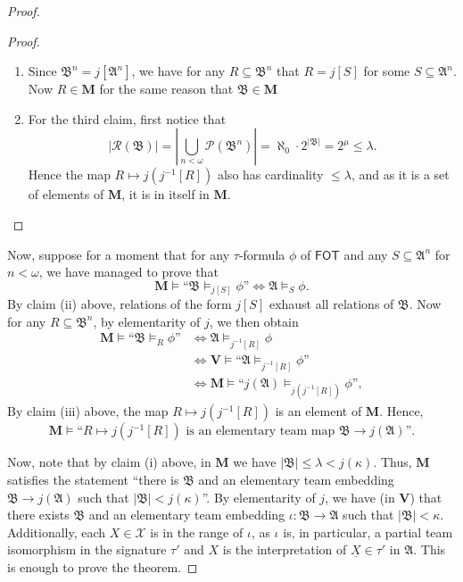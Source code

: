 \documentclass[a4paper]{amsart}
\theoremstyle{definition}
\theoremstyle{remark}
\newcommand{\A}{\mathcal{A}}
\newcommand{\B}{\mathcal{B}}
\DeclareMathOperator{\Pow}{\wp}
\newcommand\fot{\mathsf{FOT}}
\newcommand{\R}{\mathcal{R}}
\newcommand{\X}{\mathcal{X}}
\newcommand{\V}{\mathbf{V}}
\theoremstyle{definition}
\renewcommand{\A}{\mathfrak{A}}
\renewcommand{\B}{\mathfrak{B}}
\newcommand{\bM}{\mathbf{M}}
\renewcommand{\Pow}{\mathcal{P}}
\begin{document}
\begin{proof}
\begin{proof}
\begin{enumerate}
            \item  Since $\B^n = j[\A^n]$, we have for any $R\subseteq\B^n$ that $R = j[S]$ for some $S\subseteq\A^n$. Now $R\in\bM$ for the same reason that $\B\in\bM$

            \item For the third claim, first notice that
            \[
                |\R(\B)| = \left|\bigcup_{n<\omega}\Pow(\B^n)\right| = \aleph_0\cdot 2^{|\B|} = 2^\mu\leq\lambda.
            \]
            Hence the map $R\mapsto j(j^{-1}[R])$ also has cardinality $\leq\lambda$, and as it is a set of elements of $\bM$, it is in itself in $\bM$. 
        \end{enumerate}
    \end{proof}
    
    Now, suppose for a moment that for any $\tau$-formula $\phi$ of $\fot$ and any $S\subseteq\A^n$ for $n<\omega$, we have managed to prove that
    \begin{equation}
        \bM\models\text{``$\B\models_{j[S]}\phi$''} \iff \A\models_S\phi. \label{Elementary embedding of the universe preserves independence logic}
    \end{equation}
    By claim (ii) above, relations of the form $j[S]$ exhaust all relations of $\B$. Now for any $R\subseteq\B^n$, by elementarity of $j$, we then obtain
    \begin{align*}
        \bM\models\text{``$\B\models_R\phi$''} &\iff \A\models_{j^{-1}[R]}\phi \\
        &\iff \V\models\text{``$\A\models_{j^{-1}[R]}\phi$''} \\
        &\iff \bM\models\text{``$j(\A)\models_{j(j^{-1}[R])}\phi$''},
    \end{align*}
    By claim (iii) above, the map $R\mapsto j(j^{-1}[R])$ is an element of $\bM$.
    Hence,
    \[
        \bM\models\text{``$R\mapsto j(j^{-1}[R])$ is an elementary team map $\B\to j(\A)$''}.
    \]

    Now, note that by claim (i) above, in $\bM$ we have $|\B| \leq \lambda < j(\kappa)$. Thus, $\bM$ satisfies the statement ``there is $\B$ and an elementary team embedding $\B\to j(\A)$ such that $|\B|<j(\kappa)$''. By elementarity of $j$, we have (in $\V$) that there exists $\B$ and an elementary team embedding $\iota\colon\B\to\A$ such that $|\B|<\kappa$. Additionally, each $X\in\X$ is in the range of $\iota$, as $\iota$ is, in particular, a partial team isomorphism in the signature $\tau'$ and $X$ is the interpretation of $\underline X\in\tau'$ in $\A$. This is enough to prove the theorem.
    

\end{proof}
\end{document}
